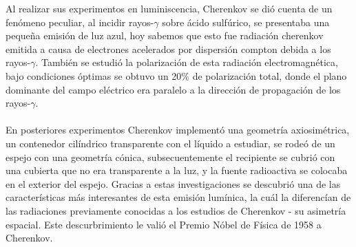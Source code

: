 
Al realizar sus experimentos en luminiscencia, Cherenkov se dió cuenta de un fenómeno peculiar, al incidir rayos-$\gamma$ sobre ácido sulfúrico\cite{CHERENKOVA20088}, se presentaba una pequeña emisión de luz azul, hoy sabemos que esto fue radiación cherenkov emitida a causa de electrones acelerados por dispersión compton debida a los rayos-$\gamma$. También se estudió la polarización de esta radiación electromagnética\cite{Bashmakov_2015}, bajo condiciones óptimas se obtuvo un 20$\%$ de polarización total, donde el plano dominante del campo eléctrico era paralelo a la dirección de propagación de los rayos-$\gamma$. \\\\
En posteriores experimentos Cherenkov implementó una geometría axiosimétrica, un contenedor cilíndrico transparente con el líquido a estudiar, se rodeó de un espejo con una geometría cónica, subsecuentemente el recipiente se cubrió con una cubierta que no era transparente a la luz, y la fuente radioactiva se colocaba en el exterior del espejo\cite{Bashmakov_2015}. Gracias a estas investigaciones se descubrió una de las características más interesantes de esta emisión lumínica, la cuál la diferencían de las radiaciones previamente conocidas a los estudios de Cherenkov - su asimetría espacial\cite{Bashmakov_2015}. Este descurbrimiento le valió el Premio Nóbel de Física de 1958 a Cherenkov.

